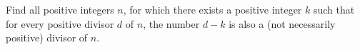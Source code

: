 Find all positive integers $n$,  for which there exists a positive integer $k$ such that for every positive divisor $d$ of $n$,  the number $d - k$ is also a (not necessarily positive) divisor of $n$.